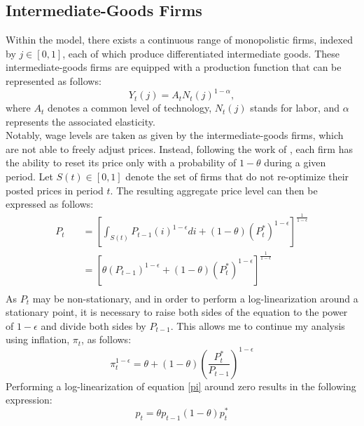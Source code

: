 \documentclass[11pt, a4paper, leqno]{article}
\begin{document}
\subsection{Intermediate-Goods Firms}
Within the model, there exists a continuous range of monopolistic firms, indexed by $j \in [0,1]$, each of which produce differentiated intermediate goods. These intermediate-goods firms are equipped with a production function that can be represented as follows:
\begin{equation}
		Y_{t}(j) = A_{t}N_{t}(j)^{1- \alpha},
\end{equation}
where $A_{t}$ denotes a common level of technology, $N_{t}(j)$ stands for labor, and $\alpha$ represents the associated elasticity.\\
Notably, wage levels are taken as given by the intermediate-goods firms, which are not able to freely adjust prices. Instead, following the work of \citet{calvo1983staggered}, each firm has the ability to reset its price only with a probability of $1- \theta$ during a given period. Let $S(t) \in [0,1]$ denote the set of firms that do not re-optimize their posted prices in period $t$. The resulting aggregate price level can then be expressed as follows:
\begin{equation}
	\begin{aligned}
	P_{t} \quad & = \left[ \int_{S(t)}^{} P_{t-1}(i)^{1- \epsilon} di + (1- \theta) \left( P^{*}_{t} \right)^{1- \epsilon} \right]^{\frac{1}{1- \epsilon}}\\
		\quad & = \left[ \theta \left( P_{t-1} \right)^{1- \epsilon} + \left(1- \theta \right) \left( P^{*}_{t} \right)^{1- \epsilon} \right]^{\frac{1}{1- \epsilon}}\\
	\end{aligned}
\end{equation}
As $P_{t}$ may be non-stationary, and in order to perform a log-linearization around a stationary point, it is necessary to raise both sides of the equation to the power of $1- \epsilon$ and divide both sides by $P_{t-1}$. This allows me to continue my analysis using inflation, $\pi_{t}$, as follows:
\begin{equation} \label{pi}
	\pi_{t}^{1- \epsilon} = \theta + (1- \theta) \left( \frac{P^{*}_{t}}{P_{t-1}} \right)^{1- \epsilon}
\end{equation}
Performing a log-linearization of equation \ref{pi} around zero results in the following expression:
\begin{equation}
	p_{t} = \theta p_{t-1} \left( 1- \theta \right) p^{*}_{t}
\end{equation}
\end{document}
